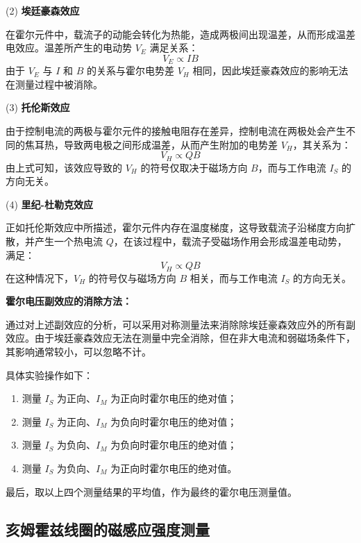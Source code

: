 \documentclass[UTF-8,twoside,cs4size]{ctexart}
\begin{document}
(2) \textbf{埃廷豪森效应} \par
在霍尔元件中，载流子的动能会转化为热能，造成两极间出现温差，从而形成温差电效应。温差所产生的电动势 $V_E$ 满足关系：
\[
V_E \propto I B
\]
由于 $V_E$ 与 $I$ 和 $B$ 的关系与霍尔电势差 $V_H$ 相同，因此埃廷豪森效应的影响无法在测量过程中被消除。 \par

(3) \textbf{托伦斯效应} \par
由于控制电流的两极与霍尔元件的接触电阻存在差异，控制电流在两极处会产生不同的焦耳热，导致两电极之间形成温差，从而产生附加的电势差 $V_H$，其关系为：
\[
V_H \propto Q B
\]
由上式可知，该效应导致的 $V_H$ 的符号仅取决于磁场方向 $B$，而与工作电流 $I_S$ 的方向无关。 \par

(4) \textbf{里纪-杜勒克效应} \par
正如托伦斯效应中所描述，霍尔元件内存在温度梯度，这导致载流子沿梯度方向扩散，并产生一个热电流 $Q$，在该过程中，载流子受磁场作用会形成温差电动势，满足：
\[
V_H \propto Q B
\]
在这种情况下，$V_H$ 的符号仅与磁场方向 $B$ 相关，而与工作电流 $I_S$ 的方向无关。 \par

\textbf{霍尔电压副效应的消除方法：} \par
通过对上述副效应的分析，可以采用对称测量法来消除除埃廷豪森效应外的所有副效应。由于埃廷豪森效应无法在测量中完全消除，但在非大电流和弱磁场条件下，其影响通常较小，可以忽略不计。 \par

具体实验操作如下：
\begin{enumerate}
    \item 测量 $I_S$ 为正向、$I_M$ 为正向时霍尔电压的绝对值；
    \item 测量 $I_S$ 为正向、$I_M$ 为负向时霍尔电压的绝对值；
    \item 测量 $I_S$ 为负向、$I_M$ 为负向时霍尔电压的绝对值；
    \item 测量 $I_S$ 为负向、$I_M$ 为正向时霍尔电压的绝对值。
\end{enumerate}
最后，取以上四个测量结果的平均值，作为最终的霍尔电压测量值。

\subsection{亥姆霍兹线圈的磁感应强度测量}
\end{document}

